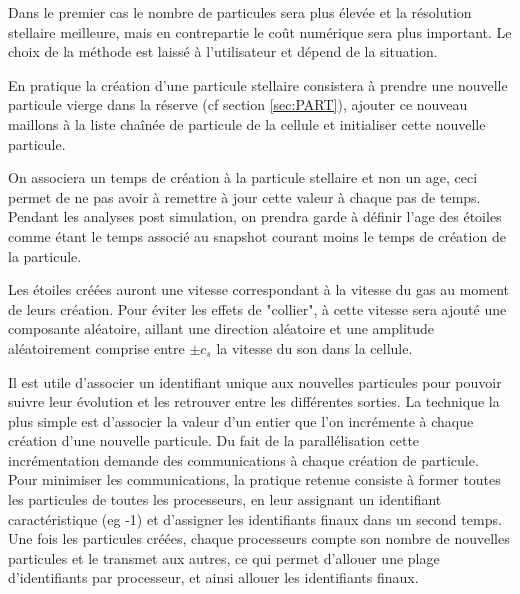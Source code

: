 Dans le premier cas le nombre de particules sera plus élevée et la résolution stellaire meilleure, mais en contrepartie le coût numérique sera plus important.
Le choix de la méthode est laissé à l'utilisateur et dépend de la situation.


En pratique la création d'une particule stellaire consistera à prendre une nouvelle particule vierge dans la réserve (cf section \ref{sec:PART}), ajouter ce nouveau maillons à la liste chaînée de particule de la cellule et initialiser cette nouvelle particule.

On associera un temps de création à la particule stellaire et non un age, ceci permet de ne pas avoir à remettre à jour cette valeur à chaque pas de temps.
Pendant les analyses post simulation, on prendra garde à définir l'age des étoiles comme étant le temps associé au snapshot courant moins le temps de création de la particule.

Les étoiles créées auront une vitesse correspondant à la vitesse du gas au moment de leurs création.
Pour éviter les effets de "collier", à cette vitesse sera ajouté une composante aléatoire, aillant une direction aléatoire et une amplitude aléatoirement comprise entre $\pm c_s$ la vitesse du son dans la cellule.

Il est utile d'associer un identifiant unique aux nouvelles particules pour pouvoir suivre leur évolution et les retrouver entre les différentes sorties.
La technique la plus simple est d'associer la valeur d'un entier que l'on incrémente à chaque création d'une nouvelle particule.
Du fait de la parallélisation cette incrémentation demande des communications à chaque création de particule.
Pour minimiser les communications, la pratique retenue consiste à former toutes les particules de toutes les processeurs, en leur assignant un identifiant caractéristique (eg -1) et d'assigner les identifiants finaux dans un second temps.
Une fois les particules créées, chaque processeurs compte son nombre de nouvelles particules et le transmet aux autres, ce qui permet d'allouer une plage d'identifiants par processeur, et ainsi allouer les identifiants finaux.

